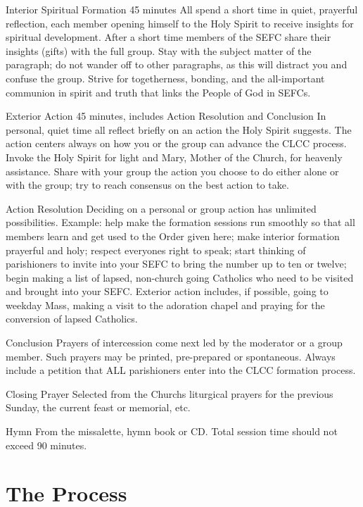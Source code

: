 \documentclass[oneside]{book}
\begin{document}
Interior Spiritual Formation 45 minutes All spend a short time in quiet,
prayerful reflection, each member opening himself to the Holy Spirit to receive
insights for spiritual development. After a short time members of the SEFC share
their insights (gifts) with the full group. Stay with the subject matter of the
paragraph; do not wander off to other paragraphs, as this will distract you and
confuse the group. Strive for togetherness, bonding, and the all-important
communion in spirit and truth that links the People of God in SEFCs.

Exterior Action 45 minutes, includes Action Resolution and Conclusion In
personal, quiet time all reflect briefly on an action the Holy Spirit
suggests. The action centers always on how you or the group can advance the CLCC
process. Invoke the Holy Spirit for light and Mary, Mother of the Church, for
heavenly assistance. Share with your group the action you choose to do either
alone or with the group; try to reach consensus on the best action to take.

Action Resolution Deciding on a personal or group action has unlimited
possibilities. Example: help make the formation sessions run smoothly so that
all members learn and get used to the Order given here; make interior formation
prayerful and holy; respect everyones right to speak; start thinking of
parishioners to invite into your SEFC to bring the number up to ten or twelve;
begin making a list of lapsed, non-church going Catholics who need to be visited
and brought into your SEFC. Exterior action includes, if possible, going to
weekday Mass, making a visit to the adoration chapel and praying for the
conversion of lapsed Catholics.

Conclusion Prayers of intercession come next led by the moderator or a group
member. Such prayers may be printed, pre-prepared or spontaneous. Always include
a petition that ALL parishioners enter into the CLCC formation process.

Closing Prayer Selected from the Churchs liturgical prayers for the previous
Sunday, the current feast or memorial, etc.

Hymn From the missalette, hymn book or CD.  Total session time should not exceed
90 minutes.


\mainmatter
{}
\part{The Process}
\end{document}
